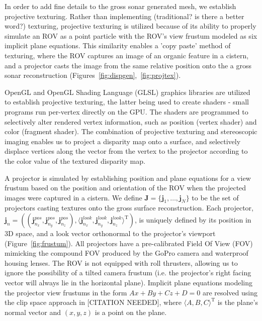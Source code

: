 \documentclass[a4paper,twoside]{article}
\begin{document}
\noindent In order to add fine details to the gross sonar generated mesh, we establish projective texturing. Rather than implementing (traditional? is there a better word?) texturing, projective texturing is utilized because of its ability to properly simulate an ROV as a point particle with the ROV's view frustum modeled as six implicit plane equations. This similarity enables a 'copy paste' method of texturing, where the ROV captures an image of an organic feature in a cistern, and a projector casts the image from the same relative position onto the a gross sonar reconstruction (Figures~\ref{fig:dispgen},~\ref{fig:projtex}). 

OpenGL and OpenGL Shading Language (GLSL) graphics libraries are utilized to establish projective texturing, the latter being used to create shaders - small programs run per-vertex directly on the GPU. The shaders are programmed to selectively alter rendered vertex information, such as position (vertex shader) and color (fragment shader). The combination of projective texturing and stereoscopic imaging enables us to project a disparity map onto a surface, and selectively displace vertices along the vector from the vertex to the projector according to the color value of the textured disparity map. 

A projector is simulated by establishing position and plane equations for a view frustum based on the position and orientation of the ROV when the projected images were captured in a cistern.  We define $\mathbf{J} = \{\mathbf{j}_{1},\dots,\mathbf{j}_{N}\}$ to be the set of projectors casting textures onto the gross surface reconstruction. Each projector, $\mathbf{j}_{n} = ((\mathbf{j}_{n_{x}}^{pos},\mathbf{j}_{n_{y}}^{pos},\mathbf{j}_{n_{z}}^{pos}), \langle \mathbf{j}_{n_{x}}^{look},\mathbf{j}_{n_{y}}^{look},\mathbf{j}_{n_{z}}^{look}\rangle ^{\mathrm{T}})$, is uniquely defined by its position in 3D space, and a look vector orthonormal to the projector's viewport (Figure~\ref{fig:frustum}). All projectors have a pre-calibrated Field Of View (FOV) mimicking the compound FOV produced by the GoPro camera and waterproof housing lenses. The ROV is not equipped with roll thrusters, allowing us to ignore the possibility of a tilted camera frustum (i.e. the projector's right facing vector will always lie in the horizontal plane). Implicit plane equations modeling the projector view frustums in the form $Ax + By + Cz + D = 0$ are resolved using the clip space approach in [CITATION NEEDED], where $\langle A, B, C\rangle ^ {\mathrm{T}}$ is the plane's normal vector and  $(x, y, z)$ is a point on the plane.
\end{document}
